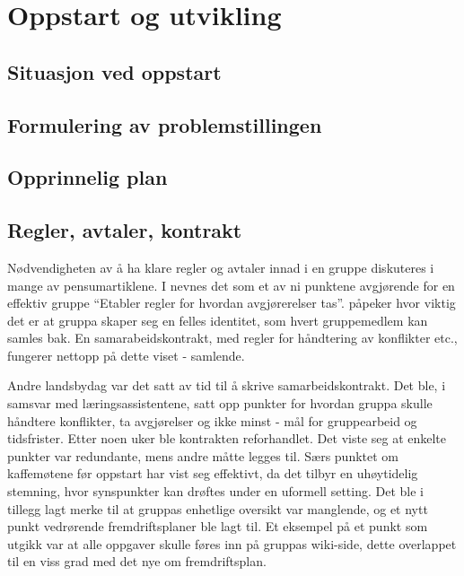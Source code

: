 
\chapter{Oppstart og utvikling}

\section{Situasjon ved oppstart}

\section{Formulering av problemstillingen}

\section{Opprinnelig plan}

\section{Regler, avtaler, kontrakt}
Nødvendigheten av å ha klare regler og avtaler innad i en gruppe diskuteres i
mange av pensumartiklene. I \cite{schwarz} nevnes det som et av ni punktene
avgjørende for en effektiv gruppe ``Etabler regler for hvordan avgjørerelser
tas''. \cite{jj} påpeker hvor viktig det er at gruppa skaper seg en felles
identitet, som hvert gruppemedlem kan samles bak. En samarabeidskontrakt, med
regler for håndtering av konflikter etc., fungerer nettopp på dette viset -
samlende. 

Andre landsbydag var det satt av tid til å skrive samarbeidskontrakt. Det ble, i
samsvar med læringsassistentene, satt opp punkter for hvordan gruppa skulle
håndtere konflikter, ta avgjørelser og ikke minst - mål for gruppearbeid og
tidsfrister. Etter noen uker ble kontrakten reforhandlet. Det viste seg at
enkelte punkter var redundante, mens andre måtte legges til. Særs punktet om
kaffemøtene før oppstart har vist seg effektivt, da det tilbyr en uhøytidelig
stemning, hvor synspunkter kan drøftes under en uformell setting. Det ble i
tillegg lagt merke til at gruppas enhetlige oversikt var manglende, og et nytt
punkt vedrørende fremdriftsplaner ble lagt til. Et eksempel på et punkt som
utgikk var at alle oppgaver skulle føres inn på gruppas wiki-side, dette
overlappet til en viss grad med det nye om fremdriftsplan.

